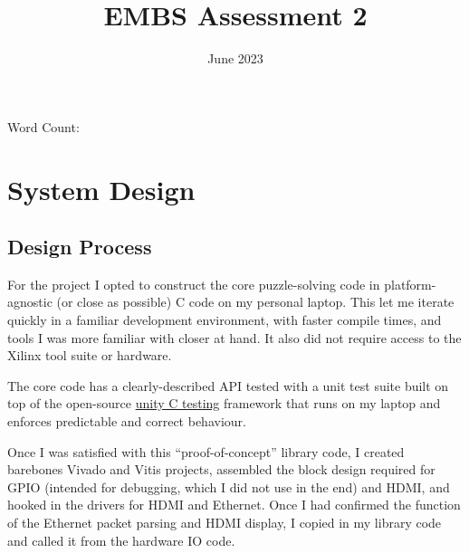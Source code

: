 \documentclass[11pt]{article}
\title{EMBS Assessment 2}
\author{}
\date{June 2023}
\begin{document}
\begin{titlepage}
\maketitle
Word Count: 
\tableofcontents
\end{titlepage}

\section{System Design}

\subsection{Design Process}


For the project I opted to construct the core puzzle-solving code in platform-agnostic (or close as possible) C code on my personal laptop.
This let me iterate quickly in a familiar development environment, with faster compile times, and tools I was more familiar with closer at hand.
It also did not require access to the Xilinx tool suite or hardware.

The core code has a clearly-described API tested with a unit test suite built on top of the open-source \href{https://github.com/ThrowTheSwitch/Unity}{unity C testing} framework that runs on my laptop and enforces predictable and correct behaviour.





Once I was satisfied with this ``proof-of-concept'' library code, I created barebones Vivado and Vitis projects, assembled the block design required for GPIO (intended for debugging, which I did not use in the end) and HDMI, and hooked in the drivers for HDMI and Ethernet.
Once I had confirmed the function of the Ethernet packet parsing and HDMI display, I copied in my library code and called it from the hardware IO code.
\end{document}
